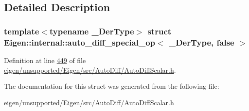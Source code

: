 \subsection{Detailed Description}
\subsubsection*{template$<$typename \+\_\+\+Der\+Type$>$\newline
struct Eigen\+::internal\+::auto\+\_\+diff\+\_\+special\+\_\+op$<$ \+\_\+\+Der\+Type, false $>$}



Definition at line \hyperlink{eigen_2unsupported_2_eigen_2src_2_auto_diff_2_auto_diff_scalar_8h_source_l00449}{449} of file \hyperlink{eigen_2unsupported_2_eigen_2src_2_auto_diff_2_auto_diff_scalar_8h_source}{eigen/unsupported/\+Eigen/src/\+Auto\+Diff/\+Auto\+Diff\+Scalar.\+h}.



The documentation for this struct was generated from the following file\+:\begin{DoxyCompactItemize}
\item 
eigen/unsupported/\+Eigen/src/\+Auto\+Diff/\+Auto\+Diff\+Scalar.\+h\end{DoxyCompactItemize}
